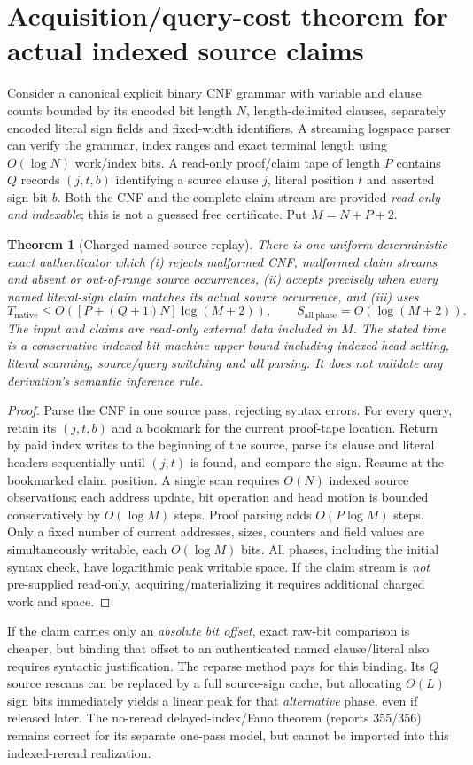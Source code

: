 \documentclass[11pt]{article}
\newtheorem{theorem}{Theorem}
\begin{document}
\section*{Acquisition/query-cost theorem for actual indexed source claims}
Consider a canonical explicit binary CNF grammar with variable and clause counts bounded by its encoded bit length $N$, length-delimited clauses, separately encoded literal sign fields and fixed-width identifiers. A streaming logspace parser can verify the grammar, index ranges and exact terminal length using $O(\log N)$ work/index bits. A read-only proof/claim tape of length $P$ contains $Q$ records $(j,t,b)$ identifying a source clause $j$, literal position $t$ and asserted sign bit $b$. Both the CNF and the complete claim stream are provided \emph{read-only and indexable}; this is not a guessed free certificate. Put $M=N+P+2$.
\begin{theorem}[Charged named-source replay]
There is one uniform deterministic exact authenticator which (i) rejects malformed CNF, malformed claim streams and absent or out-of-range source occurrences, (ii) accepts precisely when every named literal-sign claim matches its actual source occurrence, and (iii) uses
\[
T_{\mathrm{native}}\le O\!\left([P+(Q+1)N]\log(M+2)\right),\qquad
S_{\mathrm{all\ phase}}=O(\log(M+2)).
\]
The input and claims are read-only external data included in $M$. The stated time is a conservative indexed-bit-machine upper bound including indexed-head setting, literal scanning, source/query switching and all parsing. It does \emph{not} validate any derivation's semantic inference rule.
\end{theorem}
\begin{proof}
Parse the CNF in one source pass, rejecting syntax errors. For every query, retain its $(j,t,b)$ and a bookmark for the current proof-tape location. Return by paid index writes to the beginning of the source, parse its clause and literal headers sequentially until $(j,t)$ is found, and compare the sign. Resume at the bookmarked claim position. A single scan requires $O(N)$ indexed source observations; each address update, bit operation and head motion is bounded conservatively by $O(\log M)$ steps. Proof parsing adds $O(P\log M)$ steps. Only a fixed number of current addresses, sizes, counters and field values are simultaneously writable, each $O(\log M)$ bits. All phases, including the initial syntax check, have logarithmic peak writable space. If the claim stream is \emph{not} pre-supplied read-only, acquiring/materializing it requires additional charged work and space.
\end{proof}
If the claim carries only an \emph{absolute bit offset}, exact raw-bit comparison is cheaper, but binding that offset to an authenticated named clause/literal also requires syntactic justification. The reparse method pays for this binding. Its $Q$ source rescans can be replaced by a full source-sign cache, but allocating $\Theta(L)$ sign bits immediately yields a linear peak for that \emph{alternative} phase, even if released later. The no-reread delayed-index/Fano theorem (reports 355/356) remains correct for its separate one-pass model, but cannot be imported into this indexed-reread realization.
\end{document}
